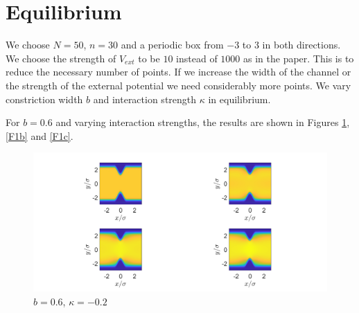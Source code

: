 \documentclass[11pt, a4paper]{article}
\theoremstyle{definition}
\begin{document}
\section{Equilibrium}
We choose $N = 50$, $n =30$ and a periodic box from $-3$ to $3$ in both directions. We choose the strength of $V_{ext}$ to be $10$ instead of $1000$ as in the paper. This is to reduce the necessary number of points. If we increase the width of the channel or the strength of the external potential we need considerably more points.
We vary constriction width $b$ and interaction strength $\kappa$ in equilibrium.

For $b = 0.6$ and varying interaction strengths, the results are shown in Figures \ref{F1a}, \ref{F1b} and \ref{F1c}.
\begin{figure}[h]
	\centering
	\includegraphics[scale=0.4]{Con1.png}
	\caption{$b = 0.6$, $\kappa =-0.2$} 
	\label{F1a}
\end{figure}
\end{document}

